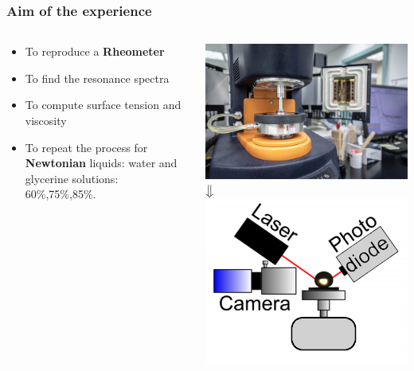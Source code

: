\documentclass[xcolor=table]{beamer}
\begin{document}
\begin{frame}
\begin{columns}
\begin{column}{.7\textwidth}
	\end{column}
\end{columns}

\end{frame}
\begin{frame}

\frametitle{Aim of the experience}
\fontsize{11}{13.2} \selectfont

\begin{columns}
	\begin{column}{.45\textwidth}
		\begin{itemize}
			\item	To reproduce a \textbf{Rheometer}
			\item	To find the resonance spectra
			\item	To compute surface tension and viscosity
			\item	To repeat the process for \textbf{Newtonian} liquids: water and glycerine solutions: 60\%,75\%,85\%.
		\end{itemize}
		
		
	\end{column}
	\begin{column}{.45\textwidth}
		\centering
		\includegraphics[width=.8\columnwidth]{rheometer_full_width.jpg}\\	
		\medskip
		$\big\Downarrow$\\
		\medskip
		\centering
		\includegraphics[width=.8\columnwidth]{setup.png}
	\end{column}
\end{columns}


\end{frame}
\end{document}
